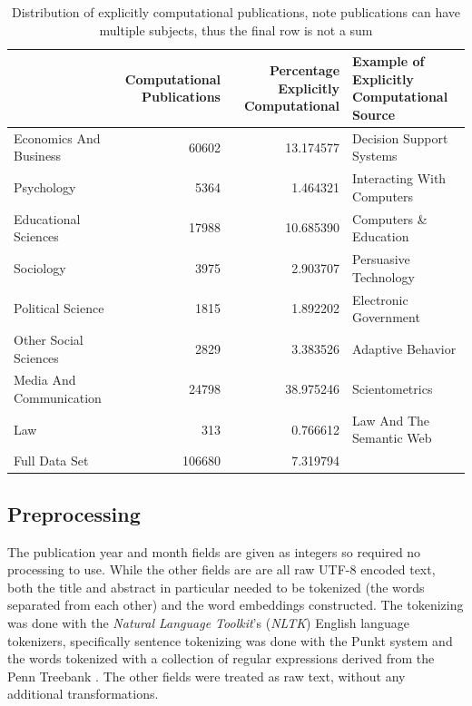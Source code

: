 \documentclass[12pt, a4paper]{article}
\begin{document}
\begin{table}[h]
	\centering
	\begin{adjustbox}{center}
		\begin{tabular}{lrrl}
			\toprule
			{} &  \pbox{20cm}{Computational\\ Publications} &  \pbox{20cm}{Percentage\\Explicitly Computational} &  \pbox{20cm}{Example of Explicitly\\Computational Source} \\
			\midrule
			Economics And Business  &           \num{60602} &        \num{13.174577} &    Decision Support Systems \\
			Psychology              &            \num{5364} &         \num{1.464321} &  Interacting With Computers \\
			Educational Sciences    &           \num{17988} &        \num{10.685390} &       Computers \& Education \\
			Sociology               &            \num{3975} &         \num{2.903707} &       Persuasive Technology \\
			Political Science       &            \num{1815} &         \num{1.892202} &       Electronic Government \\
			Other Social Sciences   &            \num{2829} &         \num{3.383526} &           Adaptive Behavior \\
			Media And Communication &           \num{24798} &        \num{38.975246} &              Scientometrics \\
			Law                     &             \num{313} &         \num{0.766612} &    Law And The Semantic Web \\
			\midrule
			Full Data Set           &          \num{106680} &         \num{7.319794} &   \\
			\bottomrule
		\end{tabular}
	\end{adjustbox}
	\caption{Distribution of explicitly computational publications, note publications can have multiple subjects, thus the final row is not a sum}\label{sum_comp}
\end{table}


\subsection{Preprocessing}

The publication year and month fields are given as integers so required no processing to use. While the other fields are are all raw UTF-8 encoded text, both the title and abstract in particular needed to be tokenized (the words separated from each other) and the word embeddings constructed. The tokenizing was done with the \textit{Natural Language Toolkit}'s (\textit{NLTK}) \citep{bird2006nltk} English language tokenizers, specifically sentence tokenizing was done with the Punkt system \citep{kiss2006unsupervised} and the words tokenized with a collection of regular expressions derived from the Penn Treebank \citep{marcus1993building}. The other fields were treated as raw text, without any additional transformations.
\end{document}
